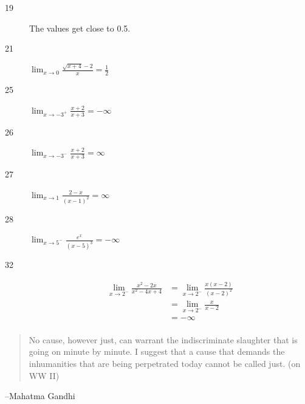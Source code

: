 \documentclass[letterpaper]{exam}
\begin{document}
\begin{description}

      \item[19] The values get close to 0.5.

      \item[21] $\lim_{x \to 0} \frac{\sqrt{x + 4} - 2}{x} = \boxed{ \frac{1}{2} }$ 

      \item[25] $\lim_{x \to -3^+} \frac{x + 2}{x + 3} = \boxed{ -\infty }$ 

      \item[26] $\lim_{x \to -3^-} \frac{x + 2}{x + 3} = \boxed{ \infty }$ 

      \item[27] $\lim_{x \to 1} \frac{2 - x}{(x - 1)^2} = \boxed{ \infty }$ 

      \item[28] $\lim_{x \to 5^-} \frac{e^x}{(x - 5)^3} = \boxed{ -\infty }$ 

      \item[32] 
        \begin{align*}
          \lim_{x \to 2^-} \frac{x^2 - 2x}{x^2 - 4x + 4}   
            & = \lim_{x \to 2^-} \frac{x(x - 2)}{(x - 2)^2} \\
            & = \lim_{x \to 2^-} \frac{x}{x - 2} \\
            & = \boxed{ - \infty } \\
        \end{align*}


    \end{description}

  \else
    \vspace{11 cm}
    \begin{quote}
      \begin{em}
        No cause, however just, can warrant the indiscriminate slaughter that is
        going on minute by minute. I suggest that a cause that demands the
        inhumanities that are being perpetrated today cannot be called just. 
        (on WW II)
      \end{em}
    \end{quote}
    \hspace{1 cm} --Mahatma Gandhi
  \fi
\end{document}
